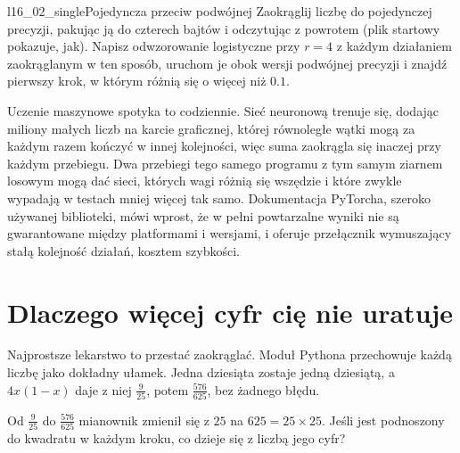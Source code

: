 
\begin{lab}{l16_02_single}{Pojedyncza przeciw podwójnej}
Zaokrąglij liczbę do pojedynczej precyzji, pakując ją do czterech bajtów i
odczytując z powrotem (plik startowy pokazuje, jak). Napisz odwzorowanie
logistyczne przy $r = 4$ z każdym działaniem zaokrąglanym w ten sposób,
uruchom je obok wersji podwójnej precyzji i znajdź pierwszy krok, w którym
różnią się o więcej niż $\num{0.1}$.
\end{lab}

\begin{worldbox}
Uczenie maszynowe spotyka to codziennie. Sieć neuronową trenuje się,
dodając miliony małych liczb na karcie graficznej, której równoległe wątki
mogą za każdym razem kończyć w innej kolejności, więc suma zaokrągla się
inaczej przy każdym przebiegu. Dwa przebiegi tego samego programu z tym samym
ziarnem losowym mogą dać sieci, których wagi różnią się wszędzie \dash{} i
które zwykle wypadają w testach mniej więcej tak samo. Dokumentacja
PyTorcha, szeroko używanej biblioteki, mówi wprost, że w pełni powtarzalne
wyniki nie są gwarantowane między platformami i wersjami, i oferuje
przełącznik wymuszający stałą kolejność działań, kosztem szybkości.
\end{worldbox}

\section{Dlaczego więcej cyfr cię nie uratuje}
\label{sec:ch16-exact}

\noindent
Najprostsze lekarstwo to przestać zaokrąglać. Moduł  Pythona
przechowuje każdą liczbę jako dokładny ułamek. Jedna dziesiąta zostaje
jedną dziesiątą, a $4x(1 - x)$ daje z niej $\tfrac{9}{25}$, potem
$\tfrac{576}{625}$, bez żadnego błędu.

\begin{think}
Od $\tfrac{9}{25}$ do $\tfrac{576}{625}$ mianownik zmienił się z $25$ na
$625 = 25 \times 25$. Jeśli jest podnoszony do kwadratu w każdym kroku, co
dzieje się z liczbą jego cyfr?
\end{think}

